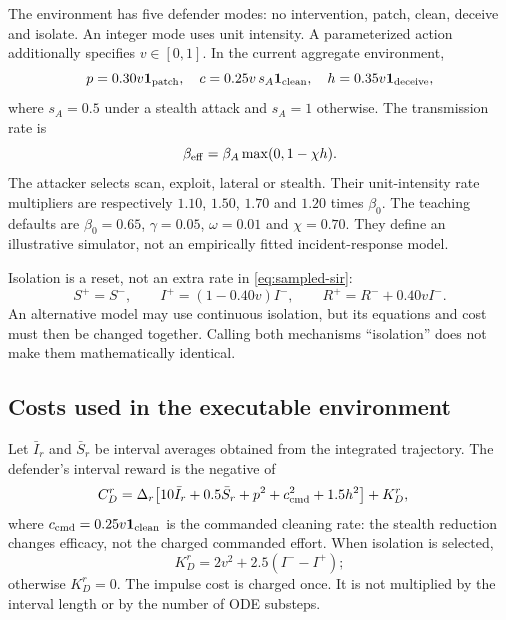 \documentclass[11pt,a4paper]{article}
\theoremstyle{definition}
\theoremstyle{remark}
\begin{document}
The environment has five defender modes: no intervention, patch, clean, deceive and isolate. An integer mode uses unit intensity. A parameterized action additionally specifies $v\in[0,1]$. In the current aggregate environment,
\begin{equation}
p=0.30v\mathbf1_{\rm patch},\quad
c=0.25v\,s_A\mathbf1_{\rm clean},\quad
h=0.35v\mathbf1_{\rm deceive},
\end{equation}
where $s_A=0.5$ under a stealth attack and $s_A=1$ otherwise. The transmission rate is
\begin{equation}
\beta_{\rm eff}=\beta_A\max(0,1-\chi h).
\end{equation}
The attacker selects scan, exploit, lateral or stealth. Their unit-intensity rate multipliers are respectively $1.10$, $1.50$, $1.70$ and $1.20$ times $\beta_0$. The teaching defaults are $\beta_0=0.65$, $\gamma=0.05$, $\omega=0.01$ and $\chi=0.70$. They define an illustrative simulator, not an empirically fitted incident-response model.

Isolation is a reset, not an extra rate in \eqref{eq:sampled-sir}:
\begin{equation}
S^+=S^-,\qquad I^+=(1-0.40v)I^-,\qquad
R^+=R^-+0.40vI^-.
\label{eq:isolation-reset}
\end{equation}
An alternative model may use continuous isolation, but its equations and cost must then be changed together. Calling both mechanisms ``isolation'' does not make them mathematically identical.

\subsection{Costs used in the executable environment}
Let $\bar I_r$ and $\bar S_r$ be interval averages obtained from the integrated trajectory. The defender's interval reward is the negative of
\begin{align}
C_D^r={}&\Delta_r\big[10\bar I_r+0.5\bar S_r+p^2+c_{\rm cmd}^2+1.5h^2\big]
+K_D^r,\label{eq:actual-cost}
\end{align}
where $c_{\rm cmd}=0.25v\mathbf1_{\rm clean}$ is the commanded cleaning rate: the stealth reduction changes efficacy, not the charged commanded effort. When isolation is selected,
\begin{equation}
K_D^r=2v^2+2.5(I^--I^+);
\end{equation}
otherwise $K_D^r=0$. The impulse cost is charged once. It is not multiplied by the interval length or by the number of ODE substeps.
\end{document}
